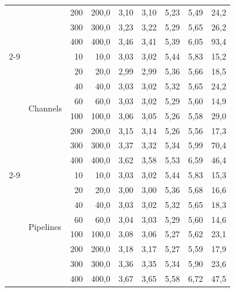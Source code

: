 \begin{table}[p]
\begin{tabular}{|l|l|r|r|r|r|r|r|r|}
 &  & 200 & 200,0 & 3,10 & 3,10 & 5,23 & 5,49 & 24,2 \\
 &  & 300 & 300,0 & 3,23 & 3,22 & 5,29 & 5,65 & 26,2 \\
 &  & 400 & 400,0 & 3,46 & 3,41 & 5,39 & 6,05 & 93,4 \\
\cline{2-9}
 & \multirow{8}{*}{Channels} & 10 & 10,0 & 3,03 & 3,02 & 5,44 & 5,83 & 15,2 \\
 &  & 20 & 20,0 & 2,99 & 2,99 & 5,36 & 5,66 & 18,5 \\
 &  & 40 & 40,0 & 3,03 & 3,02 & 5,32 & 5,65 & 24,2 \\
 &  & 60 & 60,0 & 3,03 & 3,02 & 5,29 & 5,60 & 14,9 \\
 &  & 100 & 100,0 & 3,06 & 3,05 & 5,26 & 5,58 & 29,0 \\
 &  & 200 & 200,0 & 3,15 & 3,14 & 5,26 & 5,56 & 17,3 \\
 &  & 300 & 300,0 & 3,37 & 3,32 & 5,34 & 5,99 & 70,4 \\
 &  & 400 & 400,0 & 3,62 & 3,58 & 5,53 & 6,59 & 46,4 \\
\cline{2-9}
 & \multirow{8}{*}{Pipelines} & 10 & 10,0 & 3,03 & 3,02 & 5,44 & 5,83 & 15,3 \\
 &  & 20 & 20,0 & 3,00 & 3,00 & 5,36 & 5,68 & 16,6 \\
 &  & 40 & 40,0 & 3,03 & 3,02 & 5,32 & 5,65 & 18,3 \\
 &  & 60 & 60,0 & 3,04 & 3,03 & 5,29 & 5,60 & 14,6 \\
 &  & 100 & 100,0 & 3,08 & 3,06 & 5,27 & 5,62 & 23,1 \\
 &  & 200 & 200,0 & 3,18 & 3,17 & 5,27 & 5,59 & 17,9 \\
 &  & 300 & 300,0 & 3,36 & 3,35 & 5,34 & 5,90 & 23,6 \\
 &  & 400 & 400,0 & 3,67 & 3,65 & 5,58 & 6,72 & 47,5 \\
\hline
\end{tabular}
\end{table}

